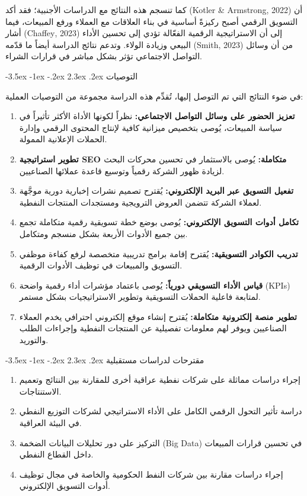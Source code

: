 \documentclass[12pt, a4paper]{report}
\makeatletter
\newcommand{\lr}[1]{\textenglish{#1}}
\renewcommand\section{\@startsection{section}{1}{\z@}%
  {-3.5ex \@plus -1ex \@minus -.2ex}%
  {2.3ex \@plus .2ex}%
  {\normalfont\Large\bfseries\color{primaryblue}}}
\makeatother
\begin{document}
كما تنسجم هذه النتائج مع الدراسات الأجنبية؛ فقد أكد (\lr{Kotler \& Armstrong}, 2022) أن التسويق الرقمي أصبح ركيزةً أساسية في بناء العلاقات مع العملاء ورفع المبيعات، فيما أشار (\lr{Chaffey}, 2023) إلى أن الاستراتيجية الرقمية الفعّالة تؤدي إلى تحسين الأداء البيعي وزيادة الولاء. وتدعم نتائج الدراسة أيضاً ما قدّمه (\lr{Smith}, 2023) من أن وسائل التواصل الاجتماعي تؤثر بشكل مباشر في قرارات الشراء.

\section{التوصيات}

في ضوء النتائج التي تم التوصل إليها، تُقدِّم هذه الدراسة مجموعة من التوصيات العملية:

\begin{enumerate}[label=\arabic*.]
  \item \textbf{تعزيز الحضور على وسائل التواصل الاجتماعي:} نظراً لكونها الأداة الأكثر تأثيراً في سياسة المبيعات، يُوصى بتخصيص ميزانية كافية لإنتاج المحتوى الرقمي وإدارة الحملات الإعلانية الممولة.
  \item \textbf{تطوير استراتيجية \lr{SEO} متكاملة:} يُوصى بالاستثمار في تحسين محركات البحث لزيادة ظهور الشركة رقمياً وتوسيع قاعدة عملائها الصناعيين.
  \item \textbf{تفعيل التسويق عبر البريد الإلكتروني:} يُقترح تصميم نشرات إخبارية دورية موجَّهة لعملاء الشركة تتضمن العروض الترويجية ومستجدات المنتجات النفطية.
  \item \textbf{تكامل أدوات التسويق الإلكتروني:} يُوصى بوضع خطة تسويقية رقمية متكاملة تجمع بين جميع الأدوات الأربعة بشكل منسجم ومتكامل.
  \item \textbf{تدريب الكوادر التسويقية:} يُقترح إقامة برامج تدريبية متخصصة لرفع كفاءة موظفي التسويق والمبيعات في توظيف الأدوات الرقمية.
  \item \textbf{قياس الأداء التسويقي دورياً:} يُوصى باعتماد مؤشرات أداء رقمية واضحة (\lr{KPIs}) لمتابعة فاعلية الحملات التسويقية وتطوير الاستراتيجيات بشكل مستمر.
  \item \textbf{تطوير منصة إلكترونية متكاملة:} يُقترح إنشاء موقع إلكتروني احترافي يخدم العملاء الصناعيين ويوفر لهم معلومات تفصيلية عن المنتجات النفطية وإجراءات الطلب والتوريد.
\end{enumerate}

\section{مقترحات لدراسات مستقبلية}

\begin{enumerate}[label=\arabic*.]
  \item إجراء دراسات مماثلة على شركات نفطية عراقية أخرى للمقارنة بين النتائج وتعميم الاستنتاجات.
  \item دراسة تأثير التحول الرقمي الكامل على الأداء الاستراتيجي لشركات التوزيع النفطي في البيئة العراقية.
  \item التركيز على دور تحليلات البيانات الضخمة (\lr{Big Data}) في تحسين قرارات المبيعات داخل القطاع النفطي.
  \item إجراء دراسات مقارنة بين شركات النفط الحكومية والخاصة في مجال توظيف أدوات التسويق الإلكتروني.
\end{enumerate}
\end{document}
